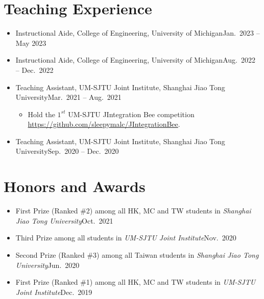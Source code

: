 \documentclass[letterpaper,10.8pt]{article}
\begin{document}
\section{Teaching Experience}
\begin{itemize}
  \item {}
        {Instructional Aide, College of Engineering, University of Michigan}{Jan.\ 2023 -- May 2023}

  \item {}
        {Instructional Aide, College of Engineering, University of Michigan}{Aug.\ 2022 -- Dec.\ 2022}

  \item {}
        {Teaching Assistant, UM-SJTU Joint Institute, Shanghai Jiao Tong University}{Mar.\ 2021 -- Aug.\ 2021}
        \begin{itemize}
          \item {}
                {Hold the \(1^{st}\) UM-SJTU JIntegration Bee competition \url{https://github.com/sleepymalc/JIntegrationBee}.}
        \end{itemize}

  \item {}
        {Teaching Assistant, UM-SJTU Joint Institute, Shanghai Jiao Tong University}{Sep.\ 2020 -- Dec.\ 2020}
\end{itemize}

\section{Honors and Awards}
\begin{itemize}
  \item {}
        {First Prize (Ranked \#2) among all HK, MC and TW students in \emph{Shanghai Jiao Tong University}}{Oct.\ 2021}

  \item {}
        {Third Prize among all students in \emph{UM-SJTU Joint Institute}}{Nov.\ 2020}

  \item {}
        {Second Prize (Ranked \#3) among all Taiwan students in \emph{Shanghai Jiao Tong University}}{Jun.\ 2020}

  \item {}
        {First Prize (Ranked \#1) among all HK, MC and TW students in \emph{UM-SJTU Joint Institute}}{Dec.\ 2019}
\end{itemize}
\end{document}
